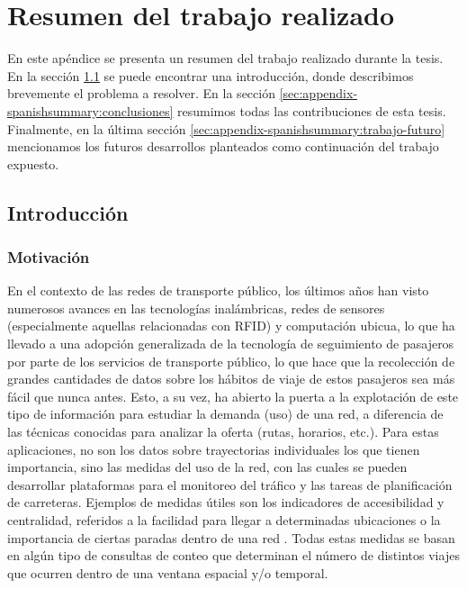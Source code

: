 \chapter{Resumen del trabajo realizado}
\label{ch:appendix-spanishsummary}

    En este ap\'endice se presenta un resumen del trabajo realizado durante la tesis. En la secci\'on \ref{sec:appendix-spanishsummary:introduccion} se puede encontrar una introducci\'on, donde describimos brevemente el problema a resolver. En la secci\'on \ref{sec:appendix-spanishsummary:conclusiones} resumimos todas las contribuciones de esta tesis. Finalmente, en la \'ultima secci\'on \ref{sec:appendix-spanishsummary:trabajo-futuro} mencionamos los futuros desarrollos planteados como continuaci\'on del trabajo expuesto.

\section{Introducci\'on}
\label{sec:appendix-spanishsummary:introduccion}

\subsection{Motivaci\'on}

    En el contexto de las redes de transporte p\'ublico, los \'ultimos a\~nos han visto numerosos avances en las tecnolog\'ias inal\'ambricas, redes de sensores (especialmente aquellas relacionadas con RFID) y computaci\'on ubicua, lo que ha llevado a una adopci\'on generalizada de la tecnolog\'ia de seguimiento de pasajeros por parte de los servicios de transporte p\'ublico, lo que hace que la recolecci\'on de grandes cantidades de datos sobre los h\'abitos de viaje de estos pasajeros sea m\'as f\'acil que nunca antes.
    Esto, a su vez, ha abierto la puerta a la explotaci\'on de este tipo de informaci\'on para estudiar la demanda (uso) de una red, a diferencia de las t\'ecnicas conocidas para analizar la oferta (rutas, horarios, etc.).
    Para estas aplicaciones, no son los datos sobre trayectorias individuales los que tienen importancia, sino las medidas del uso de la red, con las cuales se pueden desarrollar plataformas para el monitoreo del tr\'afico y las tareas de planificaci\'on de carreteras. Ejemplos de medidas \'utiles son los indicadores de accesibilidad y centralidad, referidos a la facilidad para llegar a determinadas ubicaciones o la importancia de ciertas paradas dentro de una red \cite{Morency2007193, El-Geneidy2011, Wang2015335}. Todas estas medidas se basan en alg\'un tipo de consultas de conteo que determinan el n\'umero de distintos viajes que ocurren dentro de una ventana espacial y/o temporal.
    
